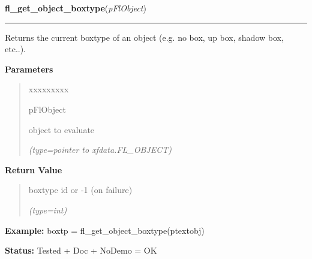     \vspace{0.5ex}

\hspace{.8\funcindent}\begin{boxedminipage}{\funcwidth}

    \raggedright \textbf{fl\_get\_object\_boxtype}(\textit{pFlObject})

    \vspace{-1.5ex}

    \rule{\textwidth}{0.5\fboxrule}
\setlength{\parskip}{2ex}
    Returns the current boxtype of an object (e.g. no box, up box, shadow 
    box, etc..).

\setlength{\parskip}{1ex}
      \textbf{Parameters}
      \vspace{-1ex}

      \begin{quote}
        \begin{Ventry}{xxxxxxxxx}

          \item[pFlObject]

          object to evaluate

            {\it (type=pointer to xfdata.FL\_OBJECT)}

        \end{Ventry}

      \end{quote}

      \textbf{Return Value}
    \vspace{-1ex}

      \begin{quote}
      boxtype id or -1 (on failure)

      {\it (type=int)}

      \end{quote}

\textbf{Example:} boxtp = fl\_get\_object\_boxtype(ptextobj)



\textbf{Status:} Tested + Doc + NoDemo = OK



    \end{boxedminipage}

    \label{xformslib:flbasic:fl_set_object_bw}

    \vspace{0.5ex}


